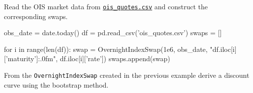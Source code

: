 \begin{question}
Read the OIS market data from \href{https://raw.githubusercontent.com/matteosan1/finance_course/master/input_files/ois_quotes.csv}{\texttt{ois\_quotes.csv}} and construct the corresponding swaps.
\end{question}

\cprotEnv\begin{solution}

\begin{ipython}
obs_date = date.today()
df = pd.read_csv('ois_quotes.csv')
swaps = []

for i in range(len(df)):
    swap = OvernightIndexSwap(1e6,
                              obs_date,
                              "{df.iloc[i]['maturity']:.0f}m",
                              df.iloc[i]['rate'])
    swaps.append(swap)
\end{ipython}
\end{solution}

\begin{question}
From the \texttt{OvernightIndexSwap} created in the previous example derive a discount curve using the bootstrap method.
\end{question}

